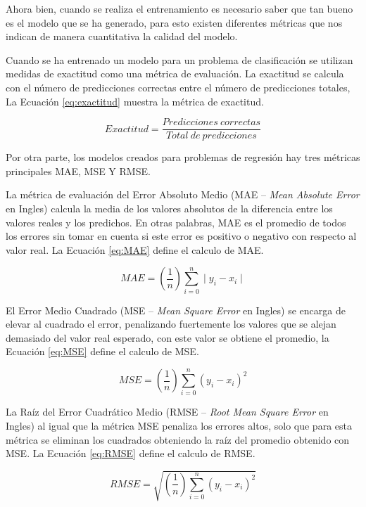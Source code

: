 Ahora bien, cuando se realiza el entrenamiento es necesario saber que tan bueno es el modelo que se ha generado, para esto existen diferentes métricas que nos indican de manera cuantitativa la calidad del modelo.

Cuando se ha entrenado un modelo para un problema de clasificación se utilizan medidas de exactitud como una métrica de evaluación. La exactitud se calcula con el número de predicciones correctas entre el número de predicciones totales, La Ecuación \ref{eq:exactitud} muestra la métrica de exactitud.

\begin{equation}
    \label{eq:exactitud}
    Exactitud = \frac{Predicciones \: correctas}{ Total \: de \: predicciones}
\end{equation}

Por otra parte, los modelos creados para problemas de regresión hay tres métricas principales MAE, MSE Y RMSE.

La métrica de evaluación del Error Absoluto Medio (MAE – \textit{Mean Absolute Error} en Ingles) calcula la media de los valores absolutos de la diferencia entre los valores reales y los predichos. En otras palabras, MAE es el promedio de todos los errores sin tomar en cuenta si este error es positivo o negativo con respecto al valor real. La Ecuación \ref{eq:MAE} define el calculo de MAE.

\begin{equation}
    \label{eq:MAE}
    MAE = (\frac{1}{n}) \displaystyle\sum\limits_{i=0}^n \mid y_i - x_i \mid
\end{equation}

El Error Medio Cuadrado (MSE – \textit{Mean Square Error} en Ingles) se encarga de elevar al cuadrado el error, penalizando fuertemente los valores que se alejan demasiado del valor real esperado, con este valor se obtiene el promedio, la Ecuación \ref{eq:MSE} define el calculo de MSE.

\begin{equation}
    \label{eq:MSE}
    MSE = (\frac{1}{n}) \displaystyle\sum\limits_{i=0}^n (y_i - x_i)^{2}
\end{equation}

La Raíz del Error Cuadrático Medio (RMSE – \textit{Root Mean Square Error} en Ingles) al igual que la métrica MSE penaliza los errores altos, solo que para esta métrica se eliminan los cuadrados obteniendo la raíz del promedio obtenido con MSE. La Ecuación \ref{eq:RMSE} define el calculo de RMSE.

\begin{equation}
    \label{eq:RMSE}
    RMSE = \sqrt {
        (\frac{1}{n}) \displaystyle\sum\limits_{i=0}^n (y_i - x_i)^{2}
    }
\end{equation}
